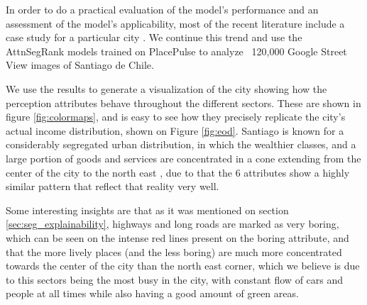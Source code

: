 In order to do a practical evaluation of the model's performance and an assessment
of the model's applicability, most of the recent literature include a case study
for  a particular city \cite{rossetti, zhang_measuring, zhang_uncovering, quercia_aesthetic,tamara_judgments,liu_machine}.
We continue this trend and use the AttnSegRank models trained on PlacePulse
to analyze ~120,000 Google Street View images of Santiago de Chile.

We use the results to generate a visualization of the city showing how the perception
attributes behave throughout the different sectors. These are shown in figure
\ref{fig:colormaps}, and is easy to see how they precisely replicate the city's actual
income distribution, shown on Figure \ref{fig:eod}. Santiago is known for a considerably
segregated urban distribution, in which the wealthier classes, and a large portion
of goods and services are concentrated in a cone extending from the center of the city
to the north east \cite{sabatini_segregacion}, due to that the 6 attributes show a
highly similar pattern that reflect that reality very well.

Some interesting insights are that as it was mentioned on section \ref{sec:seg_explainability},
highways and long roads are marked as very boring, which can be seen on the intense
red lines present on the boring attribute, and that the more lively places (and the less boring)
are much more concentrated towards the center of the city than the north east corner, which
we believe is due to this sectors being the most busy in the city, with constant flow
of cars and people at all times while also having a good amount of green areas.

